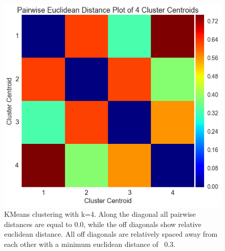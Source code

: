 \documentclass{article}
\begin{document}
\begin{figure}[H]
	\centering
	\includegraphics[scale=0.5]{figures/cluster4pairwisedistance.png}
	\caption{KMeans clustering with k=4. Along the diagonal all pairwise distances are equal to 0.0, while the off diagonals show relative euclidean distance. All off diagonals are relatively spaced away from each other with a minimum euclidean distance of ~0.3.}
	\label{fig:figure4}
\end{figure}
\end{document}
